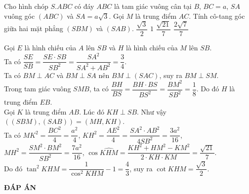 \begin{ex}%
 Cho hình chóp $S.ABC$ có đáy $ABC$ là tam giác vuông cân tại $B$, $BC=a$, $SA$ vuông góc $(ABC)$ và $SA=a\sqrt{3}$. Gọi $M$ là trung điểm $AC$. Tính cô-tang góc giữa hai mặt phẳng $(SBM)$ và $(SAB)$.
 \choice
  {\True $\dfrac{\sqrt{3}}{2} $}
  {$1 $}
  {$\dfrac{\sqrt{21}}{7} $}
  {$\dfrac{2\sqrt{7}}{7} $}
 \loigiai
  {
  \begin{center}
  \end{center}
  Gọi $E$ là hình chiếu của $A$ lên $SB$ và $H$ là hình chiếu của $M$ lên $SB$.\\
  Ta có $\dfrac{SE}{SB}=\dfrac{SE\cdot SB}{SB^2}=\dfrac{SA^2}{SA^2+AB^2}=\dfrac{3}{4}$.\\
  Ta có $BM \perp AC$ và $BM\perp SA$ nên $BM\perp (SAC)$, suy ra $BM\perp SM$.\\
  Trong tam giác vuông $SMB$, ta có $\dfrac{BH}{BS}=\dfrac{BH\cdot BS}{BS^2}=\dfrac{BM^2}{SB^2}=\dfrac{1}{8}$. Do đó $H$ là trung điểm $EB$.\\
  Gọi $K$ là trung điểm $AB$. Lúc đó $KH \perp SB$.
  Như vậy $((SBM),(SAB))=(MH,KH)$.\\
  Ta có $MK^2=\dfrac{BC^2}{4}=\dfrac{a^2}{4}$, $KH^2=\dfrac{AE^2}{4}=\dfrac{SA^2\cdot AB^2}{4SB^2}=\dfrac{3a^2}{16}$, $MH^2=\dfrac{SM^2\cdot BM^2}{SB^2}=\dfrac{7a^2}{16}$, $\cos \widehat{KHM}=\dfrac{KH^2+HM^2-KM^2}{2\cdot KH\cdot KM}=\dfrac{\sqrt{21}}{7}$. \\
  Do đó $\tan^2 KHM=\dfrac{1}{\cos^2 KHM}-1=\dfrac{4}{3}$, suy ra $\cot KHM=\dfrac{\sqrt{3}}{2}$.
  }
\end{ex}


\newpage
\begin{center}
	\textbf{ĐÁP ÁN}
\end{center}
\begin{multicols}{10}
	 
\end{multicols}

